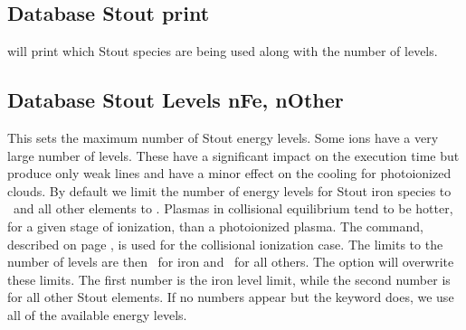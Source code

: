 \subsection{Database Stout print} 
will print which Stout species are being used
along with the number of levels.

\subsection{Database Stout Levels nFe, nOther} 
This sets the maximum number of Stout energy levels. 
Some ions have a very large number of levels.
These have a significant impact
on the execution time but produce only weak lines and have a minor effect
on the cooling for photoionized clouds.
By default we limit the number of energy levels for Stout iron species to 
\nDefaultPhotoLevelsFe\ and all other elements to \nDefaultPhotoLevels.
Plasmas in collisional equilibrium tend to be hotter, for a given
stage of ionization, than a photoionized plasma.  
The  command, described on
page \pageref{sec:CommandCoronalEquilibrium}, is used for
the collisional ionization case.
The limits to the number of levels are then \nDefaultCollLevelsFe\ for iron 
and \nDefaultCollLevels\ for all others.
The  option will overwrite these limits.
The first number is the iron level limit, while the second number 
is for all other Stout elements.
If no numbers appear but the keyword  does, we use all 
of the available energy levels.

